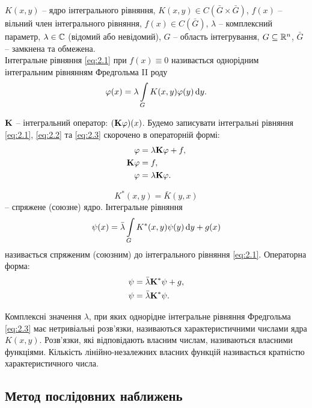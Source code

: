 $K(x, y)$ -- ядро інтегрального рівняння, $K(x, y) \in C\left(\bar G \times \bar G\right)$, $f(x)$ -- вільний член інтегрального рівняння, $f(x) \in C\left(\bar G\right)$, $\lambda$ -- комплексний параметр, $\lambda \in \CC$ (відомий або невідомий), $G$ -- область інтегрування, $G \subseteq \RR^n$, $\bar G$ -- замкнена та обмежена. \\

Інтегральне рівняння \eqref{eq:2.1} при $f(x) \equiv 0$ називається однорідним інтегральним рівнянням Фредгольма II роду
\begin{equation}
	\label{eq:2.3}
	\phi(x) = \lambda \Int_G K(x, y) \phi(y) \diff y.
\end{equation}

$\bf{K}$ -- інтегральний оператор: $(\bf{K} \phi)(x)$. Будемо записувати інтегральні рівняння \eqref{eq:2.1}, \eqref{eq:2.2} та \eqref{eq:2.3} скорочено в операторній формі:
\begin{align}
	\label{eq:2.4}
	\phi &= \lambda \bf{K} \phi + f, \\
	\label{eq:2.5}
	\bf{K} \phi &= f, \\
	\label{eq:2.6}
	\phi &= \lambda \bf{K} \phi.
\end{align}

\begin{equation}
	\label{eq:2.7}
	K^*(x, y) = \bar K(y, x)
\end{equation}
-- спряжене (союзне) ядро. Інтегральне рівняння
\begin{equation}
	\label{eq:2.8}
	\psi(x) = \bar \lambda \Int_G K^*(x, y) \psi(y) \diff y + g(x)
\end{equation}
називається спряженим (союзним) до інтегрального рівняння \eqref{eq:2.1}. Операторна форма:
\begin{align}
	\label{eq:2.9}
	\psi &= \bar \lambda \bf{K}^* \psi + g, \\
	\label{eq:2.10}
	\psi &= \bar \lambda \bf{K}^* \psi.
\end{align}

\begin{definition*}
	Комплексні значення $\lambda$, при яких однорідне інтегральне рівняння Фредгольма \eqref{eq:2.3} має нетривіальні розв’язки, називаються характеристичними числами ядра $K(x, y)$. Розв’язки, які відповідають власним числам, називаються власними функціями. Кількість лінійно-незалежних власних функцій називається кратністю характеристичного числа.
\end{definition*}

\subsection{Метод послідовних наближень}

